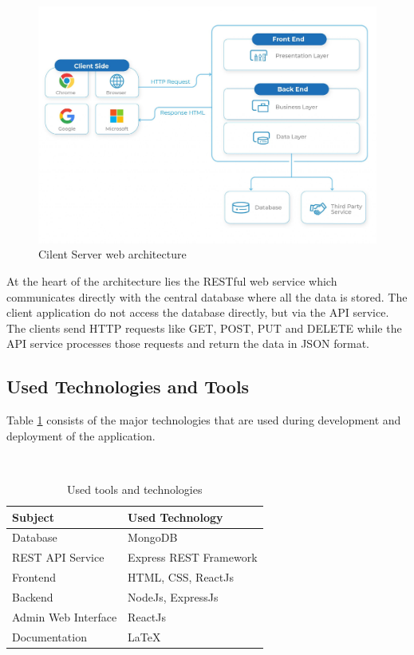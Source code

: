 \documentclass[12pt, a4paper, oneside]{article}
\begin{document}
\begin{figure}[h]
\includegraphics[width=\linewidth]{architecture}
\centering
\caption{Cilent Server web architecture}
\label{fig:arch}
\end{figure}

At the heart of the architecture lies the RESTful web service which communicates directly with the central database where all the data is stored. The client application  do not access the database directly, but via the API service. The clients send HTTP requests like GET, POST, PUT and DELETE while the API service processes those requests and return the data in JSON format. 

\pagebreak
\subsection{Used Technologies and Tools}
Table \ref{table:tech} consists of the major technologies that are used during development and deployment of the application.

\renewcommand{\arraystretch}{1.5}
\begin{table}[H]
\
\begin{tabular}{|l|l|}
\hline
\rowcolor[HTML]{C0C0C0} 
\textbf{Subject}    & \textbf{Used Technology}    \\ \hline
Database            & MongoDB                       \\ \hline
REST API Service    & Express REST Framework         \\ \hline
Frontend            & HTML, CSS, ReactJs                        \\ \hline
Backend             & NodeJs, ExpressJs             \\ \hline
Admin Web Interface & ReactJs              \\ \hline
Documentation & LaTeX \\ \hline
\end{tabular}
\caption{Used tools and technologies}
\label{table:tech}
\end{table}
\end{document}
